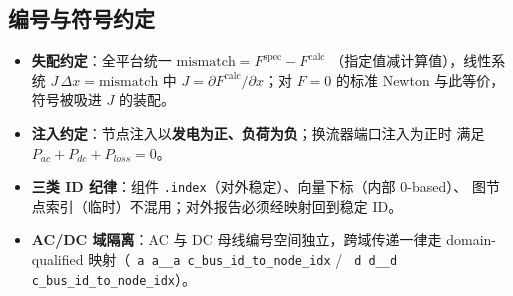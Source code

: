 \documentclass[UTF8,fontset=windows,a4paper,11pt]{ctexart}
\makeatletter
\newcommand{\fld}[1]{\texttt{\fld@scan#1\fld@stop}}
\def\fld@scan#1{%
  \ifx#1\fld@stop
  \else
    \ifx#1\_\_\allowbreak\else#1\fi
    \expandafter\fld@scan
  \fi}
\makeatother
\begin{document}
\subsection{编号与符号约定}
\begin{itemize}
  \item \textbf{失配约定}：全平台统一 $\mathrm{mismatch}=F^{\mathrm{spec}}-F^{\mathrm{calc}}$
        （指定值减计算值），线性系统 $J\,\Delta x=\mathrm{mismatch}$ 中
        $J=\partial F^{\mathrm{calc}}/\partial x$；对 $F=0$ 的标准 Newton 与此等价，
        符号被吸进 $J$ 的装配。
  \item \textbf{注入约定}：节点注入以\textbf{发电为正、负荷为负}；换流器端口注入为正时
        满足 $P_{ac}+P_{dc}+P_{loss}=0$。
  \item \textbf{三类 ID 纪律}：组件 \texttt{.index}（对外稳定）、向量下标（内部 0-based）、
        图节点索引（临时）不混用；对外报告必须经映射回到稳定 ID。
  \item \textbf{AC/DC 域隔离}：AC 与 DC 母线编号空间独立，跨域传递一律走
        domain-qualified 映射（\fld{ac\_bus\_id\_to\_node\_idx} /
        \fld{dc\_bus\_id\_to\_node\_idx}）。
\end{itemize}
\end{document}
